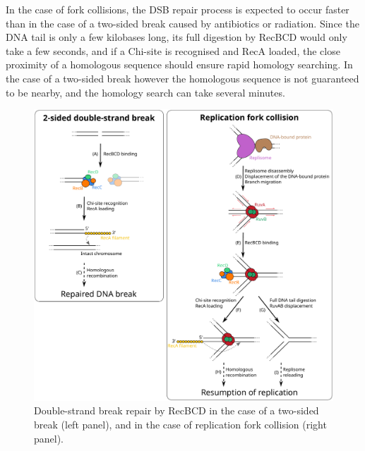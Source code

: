 In the case of fork collisions, the DSB repair process is expected to occur faster than in the case of a two-sided break caused by antibiotics or radiation. Since the DNA tail is only a few kilobases long, its full digestion by RecBCD would only take a few seconds, and if a Chi-site is recognised and RecA loaded, the close proximity of a homologous sequence should ensure rapid homology searching. In the case of a two-sided break however the homologous sequence is not guaranteed to be nearby, and the homology search can take several minutes.\cite{Wiktor2021}

\begin{figure}[htbp]
    \centering
    \includegraphics[width=.8\textwidth]{Figures/DSB_scheme.pdf}
    \caption{Double-strand break repair by RecBCD in the case of a two-sided break (left panel), and in the case of replication fork collision (right panel).}
    \label{Fig:DSB_scheme}
\end{figure}





